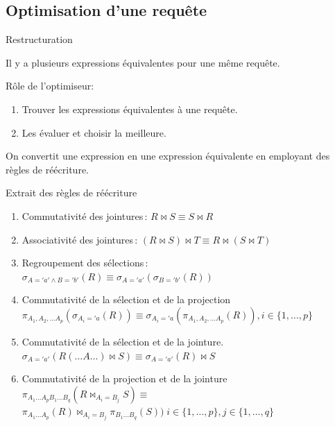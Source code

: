 

\subsection{Optimisation d'une requête}

\begin{frame}{Restructuration}

Il y a plusieurs expressions
\alert{équivalentes} pour une même requête.

\vfill

Rôle de l'optimiseur: 
\begin{enumerate}
  \item Trouver les expressions équivalentes à une requête.
  \item Les évaluer et choisir la meilleure.
\end{enumerate}

\vfill

On convertit une expression en une expression \alert{équivalente}
en employant des \alert{règles de réécriture}.

\end{frame}


\begin{frame}{Extrait des règles de réécriture}

\begin{enumerate}
\item \alert{Commutativité des jointures}\,:        $ R \Join S  \equiv S \Join R$

\item \alert{Associativité des jointures}\,:
        $(R \Join S) \Join T \equiv R \Join (S \Join T)$

\item \alert{Regroupement des sélections}\,:\\
        $\sigma_{A='a' \wedge B='b'}(R) \equiv
        \sigma_{A='a'}(\sigma_{B='b'}(R))$
\item \alert{Commutativité de la sélection et de la projection}\\
        $\pi_{A_1, A_2, \ldots A_p}(\sigma_{A_i='a} (R)) \equiv
        \sigma_{A_i='a}(\pi_{A_1, A_2, \ldots A_p}(R)), i 
        \in \{1,\ldots,p\}$
        \item \alert{Commutativité de la sélection et de la jointure}.\\
$\sigma_{A='a'} (R(\ldots A\ldots) \Join S) \equiv
     \sigma_{A='a'}(R) \Join S$
\item  \alert{Commutativité de la projection et de la jointure}\\
 $\pi_{A_1 \ldots A_pB_1\ldots B_q}(R \Join_{A_i=B_j} S) \equiv$\\
        $\pi_{A_1 \ldots A_p}(R) \Join_{A_i=B_j}\pi_{B_1\ldots B_q}(S))
  \;i \in \{1,\ldots ,p\}, j \in \{1,\ldots,q\}$
\end{enumerate}

\end{frame}

